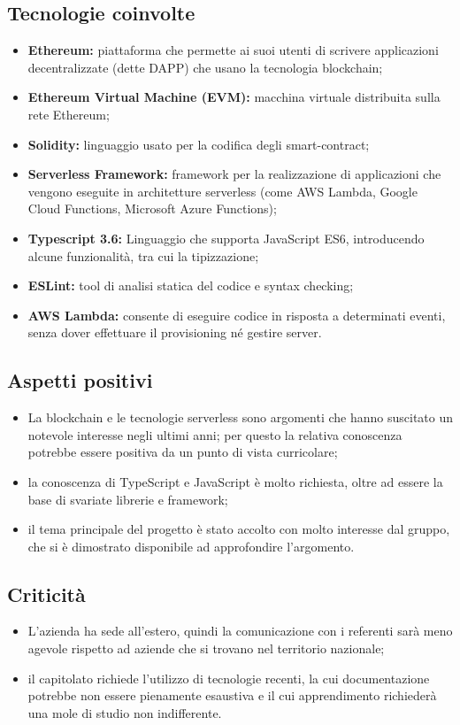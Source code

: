 \subsection{Tecnologie coinvolte}
	\begin{itemize}
		\item \textbf{Ethereum:} piattaforma che permette ai suoi utenti di scrivere applicazioni decentralizzate (dette DAPP) che usano la tecnologia blockchain;
		\item \textbf{Ethereum Virtual Machine (EVM):} macchina virtuale distribuita sulla rete Ethereum; 
		\item \textbf{Solidity:} linguaggio usato per la codifica degli smart-contract; 
		\item \textbf{Serverless Framework:} framework per la realizzazione di applicazioni che vengono eseguite in architetture serverless (come AWS Lambda, Google Cloud Functions, Microsoft Azure Functions); 
		\item \textbf{Typescript 3.6:} Linguaggio che supporta JavaScript ES6, introducendo alcune funzionalità, tra cui la tipizzazione;
		\item \textbf{ESLint:} tool di analisi statica del codice e syntax checking; 
		\item \textbf{AWS Lambda:} consente di eseguire codice in risposta a determinati eventi, senza dover effettuare il provisioning né gestire server.
	\end{itemize}

\subsection{Aspetti positivi}
	\begin{itemize}
		\item La blockchain e le tecnologie serverless sono argomenti che hanno suscitato un notevole interesse negli ultimi anni; per questo la relativa conoscenza potrebbe essere positiva da un punto di vista curricolare; 
		\item la conoscenza di TypeScript e JavaScript è molto richiesta, oltre ad essere la base di svariate librerie e framework; 
		\item il tema principale del progetto è stato accolto con molto interesse dal gruppo, che si è dimostrato disponibile ad approfondire l'argomento. 
	\end{itemize}

\subsection{Criticità}
	\begin{itemize}
		\item L'azienda ha sede all'estero, quindi la comunicazione con i referenti sarà meno agevole rispetto ad aziende che si trovano nel territorio nazionale; 
		\item il capitolato richiede l'utilizzo di tecnologie recenti, la cui documentazione potrebbe non essere pienamente esaustiva e il cui apprendimento richiederà una mole di studio non indifferente. 
	\end{itemize}

